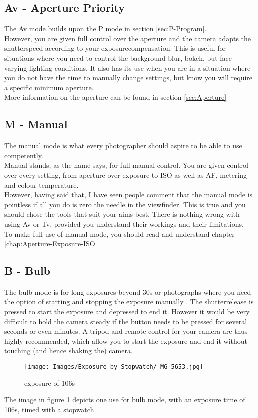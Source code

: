 \subsection{Av - Aperture Priority}

The Av mode builds upon the P mode in section \ref{sec:P-Program}.
\\
However, you are given full control over the \gls{aperture} and the camera adapts the \gls{shutterspeed} according to your \gls{exposurecompensation}. This is useful for situations where you need to control the background blur, \gls{bokeh}, but face varying lighting conditions. It also has its use when you are in a situation where you do not have the time to manually change settings, but know you will require a specific minimum \gls{aperture}.
\\
More information on the \gls{aperture} can be found in section \ref{sec:Aperture}


\subsection{M - Manual}

The manual mode is what every photographer should aspire to be able to use competently.
\\
Manual stands, as the name says, for full manual control. You are given control over every setting, from \gls{aperture} over \gls{exposure} to \gls{ISO} as well as \gls{AF}, metering and colour temperature.
\\
However, having said that, I have seen people comment that the manual mode is pointless if all you do is zero the needle in the \gls{viewfinder}. This is true and you should chose the tools that suit your aims best. There is nothing wrong with using Av or Tv, provided you understand their workings and their limitations.
\\
To make full use of manual mode, you should read and understand chapter \ref{chap:Aperture-Exposure-ISO}.

\subsection{B - Bulb}

The bulb mode is for long \glspl{exposure} beyond 30s or photographs where you need the option of starting and stopping the \gls{exposure} manually . The \gls{shutterrelease} is pressed to start the \gls{exposure} and depressed to end it. However it would be very difficult to hold the camera steady if the button needs to be pressed for several seconds or even minutes. A tripod and remote control for your camera are thus highly recommended, which allow you to start the \gls{exposure} and end it without touching (and hence shaking the) camera.

\begin{figure}[htbp]
\centering
	\texttt{[image: Images/Exposure-by-Stopwatch/\_MG\_5653.jpg]}
	\caption{exposure of 106s}
	\label{fig:MG_5653}
\end{figure}

The image in figure \ref{fig:MG_5653} depicts one use for bulb mode, with an \gls{exposure} time of 106s, timed with a stopwatch.


